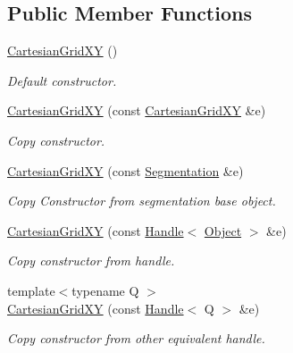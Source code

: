 \subsection*{Public Member Functions}
\begin{DoxyCompactItemize}
\item 
\hyperlink{class_d_d4hep_1_1_geometry_1_1_cartesian_grid_x_y_a4ff0e0264e97768c0d368507ee149ebf}{CartesianGridXY} ()
\begin{DoxyCompactList}\small\item\em Default constructor. \item\end{DoxyCompactList}\item 
\hyperlink{class_d_d4hep_1_1_geometry_1_1_cartesian_grid_x_y_ac3b77b74ddadb039490b10f21492d55d}{CartesianGridXY} (const \hyperlink{class_d_d4hep_1_1_geometry_1_1_cartesian_grid_x_y}{CartesianGridXY} \&e)
\begin{DoxyCompactList}\small\item\em Copy constructor. \item\end{DoxyCompactList}\item 
\hyperlink{class_d_d4hep_1_1_geometry_1_1_cartesian_grid_x_y_ae96dc4f394b3eaded63e07e88fa97e62}{CartesianGridXY} (const \hyperlink{class_d_d4hep_1_1_geometry_1_1_segmentation}{Segmentation} \&e)
\begin{DoxyCompactList}\small\item\em Copy Constructor from segmentation base object. \item\end{DoxyCompactList}\item 
\hyperlink{class_d_d4hep_1_1_geometry_1_1_cartesian_grid_x_y_a5ac01bc898ef0925a5f80e2df58da136}{CartesianGridXY} (const \hyperlink{class_d_d4hep_1_1_handle}{Handle}$<$ \hyperlink{class_t}{Object} $>$ \&e)
\begin{DoxyCompactList}\small\item\em Copy constructor from handle. \item\end{DoxyCompactList}\item 
{\footnotesize template$<$typename Q $>$ }\\\hyperlink{class_d_d4hep_1_1_geometry_1_1_cartesian_grid_x_y_a3308769eb474b27e025bc6ac41386dd7}{CartesianGridXY} (const \hyperlink{class_d_d4hep_1_1_handle}{Handle}$<$ Q $>$ \&e)
\begin{DoxyCompactList}\small\item\em Copy constructor from other equivalent handle. \item\end{DoxyCompactList}\item 

\end{DoxyCompactItemize}
